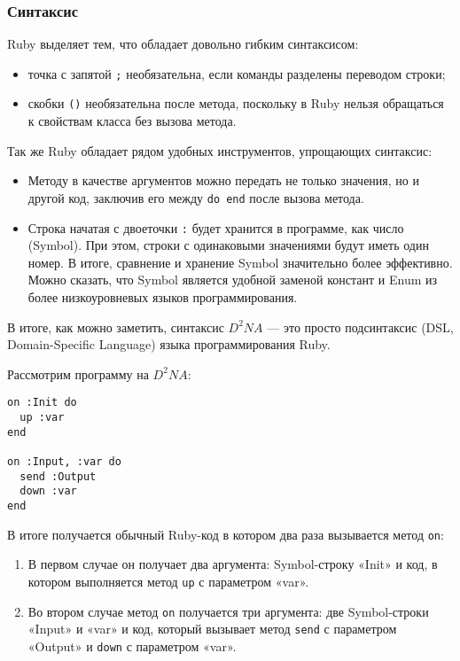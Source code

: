 \documentclass[utf8,a5paper,portrait,12pt]{eskdtext}
\begin{document}
\newpage
\subsubsection{Синтаксис}

Ruby выделяет тем, что обладает довольно гибким синтаксисом:
\begin{itemize}
  \item точка с запятой \texttt{;} необязательна, если команды разделены
        переводом строки;
  \item скобки \texttt{()} необязательна после метода, поскольку в Ruby нельзя
        обращаться к свойствам класса без вызова метода.
\end{itemize}

Так же Ruby обладает рядом удобных инструментов, упрощающих синтаксис:
\begin{itemize}
  \item Методу в качестве аргументов можно передать не только значения, но и
        другой код, заключив его между \texttt{do end} после вызова метода.
  \item Строка начатая с двоеточки \texttt{:} будет хранится в программе, как
        число (Symbol). При этом, строки с одинаковыми значениями будут иметь
        один номер. В итоге, сравнение и хранение Symbol значительно более
        эффективно. Можно сказать, что Symbol является удобной заменой констант
        и Enum из более низкоуровневых языков программирования.
\end{itemize}

В итоге, как можно заметить, синтаксис $D^2NA$ — это просто подсинтаксис
(DSL, Domain-Specific Language) языка программирования Ruby.

Рассмотрим программу на $D^2NA$:
\begin{verbatim}
on :Init do
  up :var
end

on :Input, :var do
  send :Output
  down :var
end
\end{verbatim}

В итоге получается обычный Ruby-код в котором два раза вызывается метод
\texttt{on}:
\begin{enumerate}
  \item В первом случае он получает два аргумента: Symbol-строку «Init» и код,
        в котором выполняется метод \texttt{up} с параметром «var».
  \item Во втором случае метод \texttt{on} получается три аргумента: две
        Symbol-строки «Input» и «var» и код, который вызывает метод
        \texttt{send} с параметром «Output» и \texttt{down} с параметром «var».
\end{enumerate}
\end{document}
